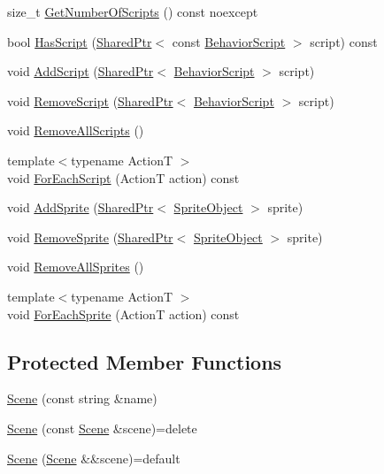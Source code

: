 \begin{DoxyCompactItemize}
\item 
size\+\_\+t \hyperlink{classmage_1_1_scene_a33cecd2fd2b393ccac84b94ec8cc53c0}{Get\+Number\+Of\+Scripts} () const noexcept
\item 
bool \hyperlink{classmage_1_1_scene_a9dd6c49e9db7590de1de4fbd128c78a9}{Has\+Script} (\hyperlink{namespacemage_a1e01ae66713838a7a67d30e44c67703e}{Shared\+Ptr}$<$ const \hyperlink{classmage_1_1_behavior_script}{Behavior\+Script} $>$ script) const
\item 
void \hyperlink{classmage_1_1_scene_ab97b66c81c32681699052e154d0e0722}{Add\+Script} (\hyperlink{namespacemage_a1e01ae66713838a7a67d30e44c67703e}{Shared\+Ptr}$<$ \hyperlink{classmage_1_1_behavior_script}{Behavior\+Script} $>$ script)
\item 
void \hyperlink{classmage_1_1_scene_a82705ba56543dea410439760b1667bc5}{Remove\+Script} (\hyperlink{namespacemage_a1e01ae66713838a7a67d30e44c67703e}{Shared\+Ptr}$<$ \hyperlink{classmage_1_1_behavior_script}{Behavior\+Script} $>$ script)
\item 
void \hyperlink{classmage_1_1_scene_a04b6e0b4d9ca18d15d3da098e581d336}{Remove\+All\+Scripts} ()
\item 
{\footnotesize template$<$typename ActionT $>$ }\\void \hyperlink{classmage_1_1_scene_a4d16d973adce12868b9a0df9d92ef6d6}{For\+Each\+Script} (ActionT action) const
\item 
void \hyperlink{classmage_1_1_scene_a735a4eba6bf6a072195f1cfc58dfca47}{Add\+Sprite} (\hyperlink{namespacemage_a1e01ae66713838a7a67d30e44c67703e}{Shared\+Ptr}$<$ \hyperlink{classmage_1_1_sprite_object}{Sprite\+Object} $>$ sprite)
\item 
void \hyperlink{classmage_1_1_scene_a6d886d48157b9988ab61cc9b01ee752e}{Remove\+Sprite} (\hyperlink{namespacemage_a1e01ae66713838a7a67d30e44c67703e}{Shared\+Ptr}$<$ \hyperlink{classmage_1_1_sprite_object}{Sprite\+Object} $>$ sprite)
\item 
void \hyperlink{classmage_1_1_scene_aad8b532e9c127fd216ca9db9ad9f3420}{Remove\+All\+Sprites} ()
\item 
{\footnotesize template$<$typename ActionT $>$ }\\void \hyperlink{classmage_1_1_scene_ae181b160f9a75593db9f551c9c233329}{For\+Each\+Sprite} (ActionT action) const
\end{DoxyCompactItemize}
\subsection*{Protected Member Functions}
\begin{DoxyCompactItemize}
\item 
\hyperlink{classmage_1_1_scene_aab61b38547fc53aa9c5b3b559f4d2e26}{Scene} (const string \&name)
\item 
\hyperlink{classmage_1_1_scene_a88d83ccb2e10549d5370f850b2b4c228}{Scene} (const \hyperlink{classmage_1_1_scene}{Scene} \&scene)=delete
\item 
\hyperlink{classmage_1_1_scene_a35b8fc4242c2348e53014b96416fc3d3}{Scene} (\hyperlink{classmage_1_1_scene}{Scene} \&\&scene)=default
\end{DoxyCompactItemize}
